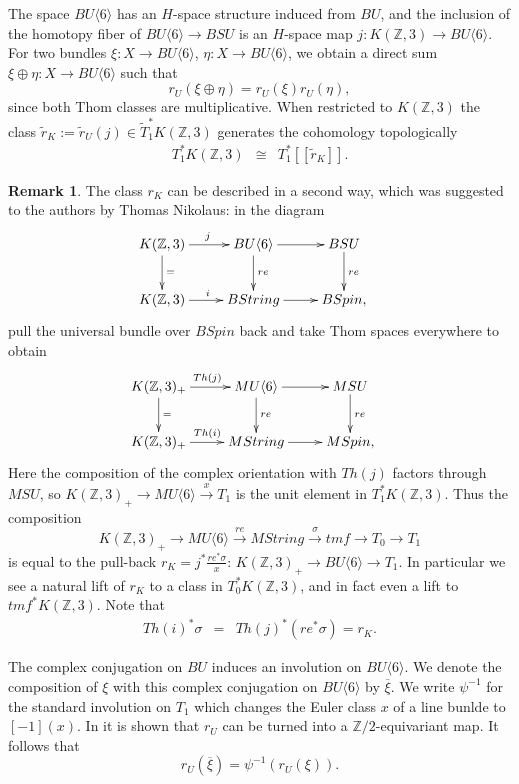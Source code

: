 \documentclass{amsart}
\newcommand {\Z}{{\mathbb Z}}
\numberwithin{equation}{section}
\theoremstyle{definition}  %
\newtheorem{set theory}[thm]{Set Theoretic Prelude}
\newtheorem{remark}[thm]{Remark}
\begin{document}
The space $BU\langle 6\rangle$ has an $H$-space structure induced from $BU$, and the inclusion of the homotopy fiber of $BU\langle 6 \rangle \to BSU$ is an $H$-space map $j:K(\Z,3)\to BU\langle 6\rangle$.
For two bundles $\xi:X\to BU\langle 6\rangle$, $\eta:X\to BU\langle 6\rangle$, we obtain a direct sum $\xi\oplus \eta:X\to BU\langle 6\rangle$ such that
$$r_U(\xi\oplus\eta)=r_U(\xi)r_U(\eta),$$
since both Thom classes are multiplicative. When restricted to $K(\Z,3)$ the class $\tilde{r}_K:=\tilde{r}_U(j)\in \tilde{T}_1^*K(\Z,3)$ generates the cohomology topologically
\begin{eqnarray}\label{CohKZ3}
T_1^*K(\Z ,3)& \cong & T_1^*[\![\tilde{r}_K]\!].
\end{eqnarray}

\begin{remark}
The class $r_K$ can be described in a second way, which was suggested to the authors by Thomas Nikolaus:
in the diagram
\begin{eqnarray}\label{}
&\xymatrix{
K(\Z,3)
\ar[r]^j\ar[d]^{=}
&
BU\langle 6 \rangle
\ar[r]\ar[d]^{re}
&
BSU\ar[d]^{re}
\\
K(\Z,3)
\ar[r]^i
&
BString 
\ar[r]
&
BSpin,
}&
\end{eqnarray}
pull the universal bundle over $BSpin$ back and take Thom spaces everywhere to obtain  
\begin{eqnarray}\label{}
&\xymatrix{
K(\Z,3)_+
\ar[r]^{Th(j)}\ar[d]^{=}
&
MU\langle 6 \rangle
\ar[r]\ar[d]^{re}
&
MSU\ar[d]^{re}
\\
K(\Z,3)_+
\ar[r]^{Th(i)}
&
MString 
\ar[r]
&
MSpin,
}&
\end{eqnarray}
Here the composition of the complex orientation with $Th(j)$ factors through $MSU$, so $K(\Z,3)_+\to MU\langle 6 \rangle \stackrel{x}{\to}  T_1$ is the unit element in $T_1^*K(\Z,3)$.
Thus the composition $$K(\Z,3)_+\to MU\langle 6 \rangle\stackrel{re}{\to}MString\stackrel{\sigma}{\to} tmf\to T_0\to T_1$$ is equal to the pull-back $r_K=j^*\frac{re^*\sigma }{x}$: 
$K(\Z,3)_+\to BU\langle 6\rangle\to T_1$.
In particular we see a natural lift of $r_K$ to a class in $T_0^*K(\Z,3)$, and in fact even a lift to $tmf^*K(\Z,3)$.
Note that
 \begin{eqnarray}\label{Thomclass}
 Th(i)^*\sigma&=&Th(j)^*(re^*\sigma)=r_K.
\end{eqnarray}
\end{remark}

The complex conjugation on $BU$ induces an involution on $BU\langle 6\rangle$. We denote the composition of $\xi$ with this complex conjugation on $BU\langle 6\rangle$ by $\overline{\xi}$. We write $\psi^{-1}$ for the standard involution on $T_1$ which changes the Euler class $x$ of a line bunlde to $[-1](x)$. In \cite{MR3448393} it is shown that $r_U$ can be turned into a  $\Z/2$-equivariant map.
It follows that $$r_U(\overline{\xi})=\psi^{-1}(r_U(\xi)).$$
\end{document}
